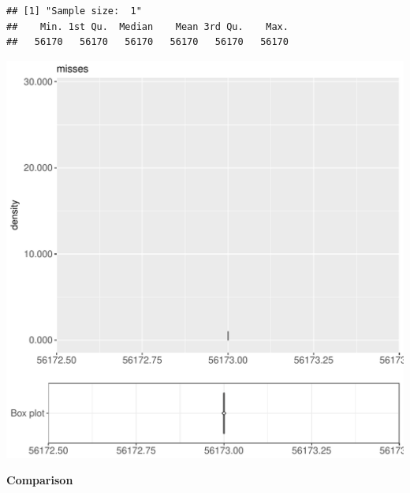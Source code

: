 \documentclass{article}\usepackage[]{graphicx}\usepackage[]{color}
\makeatletter
\def\maxwidth{ %
  \ifdim\Gin@nat@width>\linewidth
    \linewidth
  \else
    \Gin@nat@width
  \fi
}
\newenvironment{kframe}{%
 \def\at@end@of@kframe{}%
 \ifinner\ifhmode%
  \def\at@end@of@kframe{\end{minipage}}%
  \begin{minipage}{\columnwidth}%
 \fi\fi%
 \def\FrameCommand##1{\hskip\@totalleftmargin \hskip-\fboxsep
 \colorbox{shadecolor}{##1}\hskip-\fboxsep
     \hskip-\linewidth \hskip-\@totalleftmargin \hskip\columnwidth}%
 \MakeFramed {\advance\hsize-\width
   \@totalleftmargin\z@ \linewidth\hsize
   \@setminipage}}%
 {\par\unskip\endMakeFramed%
 \at@end@of@kframe}
\newenvironment{knitrout}{}{} %
\makeatother
\begin{document}
\begin{knitrout}
\color{fgcolor}\begin{kframe}
\begin{verbatim}
## [1] "Sample size:  1"
##    Min. 1st Qu.  Median    Mean 3rd Qu.    Max. 
##   56170   56170   56170   56170   56170   56170
\end{verbatim}


{\ttfamily\noindent\bfseries{}}\end{kframe}
\includegraphics[width=\maxwidth]{figure/RH4_trivialcaching_password-1} 

\end{knitrout}
  
 \textbf{Comparison}
  
\end{document}
